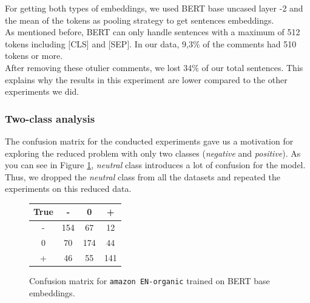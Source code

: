 For getting both types of embeddings, we used BERT base uncased layer -2 and the mean of the tokens as pooling strategy to get sentences embeddings.\\
As mentioned before, BERT can only handle sentences with a maximum of 512 tokens including [CLS] and [SEP]. In our data, 9,3\% of the comments had 510 tokens or more.\\
After removing these otulier comments, we lost 34\% of our total sentences. This explains why the results in this experiment are lower compared to the other experiments we did.
\subsubsection{Two-class analysis}
The confusion matrix for the conducted experiments gave us a motivation for exploring the reduced problem with only two classes ({\it negative} and {\it positive}). As you can see in Figure \ref{confusion}, {\it neutral} class introduces a lot of confusion for the model. Thus, we dropped the {\it neutral} class from all the datasets and repeated the experiments on this reduced data.
\begin{figure}
\begin{center}
 \begin{tabular}{|c || c | c | c|} 
 \hline
 True & - & 0 & + \\
 \hline
 - & 154 & 67 & 12 \\
 0 & 70 & 174 & 44 \\
 + & 46 & 55 & 141 \\
 \hline
\end{tabular}
\end{center}
\caption{Confusion matrix for {\tt amazon EN-organic} trained on BERT base embeddings.}
\label{confusion}
\end{figure}